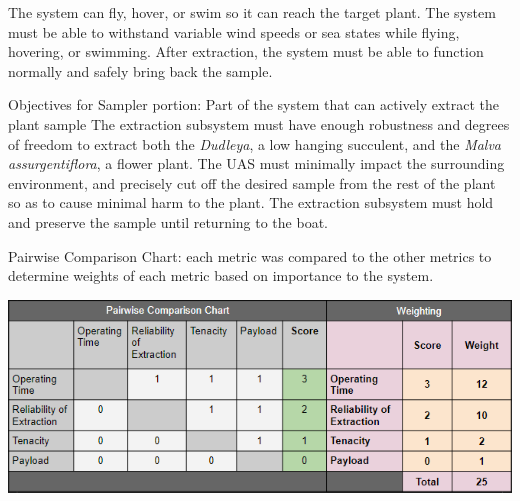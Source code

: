 \documentclass{wrcecapstone}
\newcommand{\Dudleya}{\emph{Dudleya}}
\newcommand{\Malvaassurgentiflora}{\emph{Malva assurgentiflora}}
\begin{document}
The system can fly, hover, or swim so it can reach the target plant. The system must be able to withstand variable wind speeds or sea states while flying, hovering, or swimming. After extraction, the system must be able to function normally and safely bring back the sample.

Objectives for Sampler portion: Part of the system that can actively extract the plant sample
The extraction subsystem must have enough robustness and degrees of freedom to extract both the \Dudleya, a low hanging succulent, and the \Malvaassurgentiflora, a flower plant. The UAS must minimally impact the surrounding environment, and precisely cut off the desired sample from the rest of the plant so as to cause minimal harm to the plant. The extraction subsystem must hold and preserve the sample until returning to the boat.
\begin{table}
\caption{Pairwise Comparison Chart: each metric was compared to the other metrics to determine weights of each metric based on importance to the system.}
\label{tab:2.4.2}
\begin{center}
\includegraphics[width=\columnwidth]{figures/table-242.png}
\end{center}
\end{table}
\end{document}
